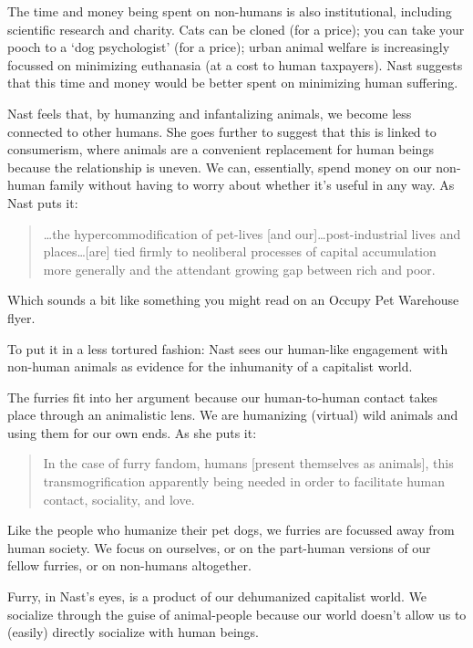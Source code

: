 The time and money being spent on non-humans is also institutional, including scientific research and charity. Cats can be cloned (for a price); you can take your pooch to a `dog psychologist' (for a price); urban animal welfare is increasingly focussed on minimizing euthanasia (at a cost to human taxpayers). Nast suggests that this time and money would be better spent on minimizing human suffering.

Nast feels that, by humanzing and infantalizing animals, we become less connected to other humans. She goes further to suggest that this is linked to consumerism, where animals are a convenient replacement for human beings because the relationship is uneven. We can, essentially, spend money on our non-human family without having to worry about whether it's useful in any way. As Nast puts it:

\begin{quote}
  \ldots the hypercommodification of pet-lives [and our]\ldots  post-industrial lives and places\ldots  [are] tied firmly to neoliberal processes of capital accumulation more generally and the attendant growing gap between rich and poor.
\end{quote}

Which sounds a bit like something you might read on an Occupy Pet Warehouse flyer.

To put it in a less tortured fashion: Nast sees our human-like engagement with non-human animals as evidence for the inhumanity of a capitalist world.

The furries fit into her argument because our human-to-human contact takes place through an animalistic lens. We are humanizing (virtual) wild animals and using them for our own ends. As she puts it:

\begin{quote}
  In the case of furry fandom, humans [present themselves as animals], this transmogrification apparently being needed in order to facilitate human contact, sociality, and love.
\end{quote}

Like the people who humanize their pet dogs, we furries are focussed away from human society. We focus on ourselves, or on the part-human versions of our fellow furries, or on non-humans altogether.

Furry, in Nast's eyes, is a product of our dehumanized capitalist world. We socialize through the guise of animal-people because our world doesn't allow us to (easily) directly socialize with human beings.

